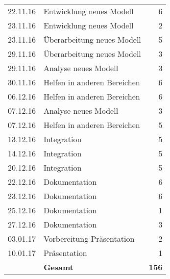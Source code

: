 \begin{minipage}{0.5\textwidth}
\begin{tabular}{llr}
       22.11.16&Entwicklung neues Modell&6 \\
       23.11.16&Entwicklung neues Modell&2 \\
       23.11.16&Überarbeitung neues Modell&5 \\
       
       29.11.16&Überarbeitung neues Modell&3 \\
       29.11.16&Analyse neues Modell&3 \\
       30.11.16&Helfen in anderen Bereichen&6 \\
       
       06.12.16&Helfen in anderen Bereichen&6 \\
       07.12.16&Analyse neues Modell&3 \\
       07.12.16&Helfen in anderen Bereichen&5 \\
       
       13.12.16&Integration&5 \\
       14.12.16&Integration&5 \\ 
            
       20.12.16&Integration&5 \\
       
       22.12.16&Dokumentation&6 \\
       23.12.16&Dokumentation&6 \\
       25.12.16&Dokumentation&1 \\
       
       
       27.12.16&Dokumentation&3 \\
       03.01.17&Vorbereitung Präsentation&2 \\
       10.01.17&Präsentation&1 \\
       &\textbf{Gesamt}&\textbf{156}
    \end{tabular}
\end{minipage}